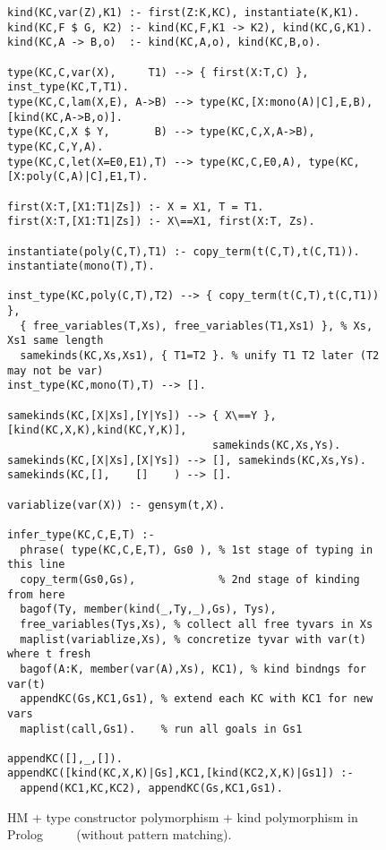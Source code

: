 \documentclass[runningheads,a4paper]{llncs}
\begin{document}
\begin{figure} %
\begin{verbatim}
kind(KC,var(Z),K1) :- first(Z:K,KC), instantiate(K,K1).
kind(KC,F $ G, K2) :- kind(KC,F,K1 -> K2), kind(KC,G,K1).
kind(KC,A -> B,o)  :- kind(KC,A,o), kind(KC,B,o).

type(KC,C,var(X),     T1) --> { first(X:T,C) }, inst_type(KC,T,T1).
type(KC,C,lam(X,E), A->B) --> type(KC,[X:mono(A)|C],E,B), [kind(KC,A->B,o)].
type(KC,C,X $ Y,       B) --> type(KC,C,X,A->B), type(KC,C,Y,A).
type(KC,C,let(X=E0,E1),T) --> type(KC,C,E0,A), type(KC,[X:poly(C,A)|C],E1,T).

first(X:T,[X1:T1|Zs]) :- X = X1, T = T1.
first(X:T,[X1:T1|Zs]) :- X\==X1, first(X:T, Zs).

instantiate(poly(C,T),T1) :- copy_term(t(C,T),t(C,T1)).
instantiate(mono(T),T).

inst_type(KC,poly(C,T),T2) --> { copy_term(t(C,T),t(C,T1)) }, 
  { free_variables(T,Xs), free_variables(T1,Xs1) }, % Xs, Xs1 same length
  samekinds(KC,Xs,Xs1), { T1=T2 }. % unify T1 T2 later (T2 may not be var)
inst_type(KC,mono(T),T) --> [].

samekinds(KC,[X|Xs],[Y|Ys]) --> { X\==Y }, [kind(KC,X,K),kind(KC,Y,K)],
                                samekinds(KC,Xs,Ys).
samekinds(KC,[X|Xs],[X|Ys]) --> [], samekinds(KC,Xs,Ys).
samekinds(KC,[],    []    ) --> [].

variablize(var(X)) :- gensym(t,X).

infer_type(KC,C,E,T) :-
  phrase( type(KC,C,E,T), Gs0 ), % 1st stage of typing in this line
  copy_term(Gs0,Gs),             % 2nd stage of kinding from here
  bagof(Ty, member(kind(_,Ty,_),Gs), Tys),
  free_variables(Tys,Xs), % collect all free tyvars in Xs
  maplist(variablize,Xs), % concretize tyvar with var(t) where t fresh
  bagof(A:K, member(var(A),Xs), KC1), % kind bindngs for var(t)
  appendKC(Gs,KC1,Gs1), % extend each KC with KC1 for new vars
  maplist(call,Gs1).    % run all goals in Gs1

appendKC([],_,[]).
appendKC([kind(KC,X,K)|Gs],KC1,[kind(KC2,X,K)|Gs1]) :-
  append(KC1,KC,KC2), appendKC(Gs,KC1,Gs1).
\end{verbatim}
\caption{HM + type constructor polymorphism + kind polymorphism in Prolog
        $\qquad$
        (without pattern matching).}
\label{fig:HMtck}
\end{figure}
\end{document}
